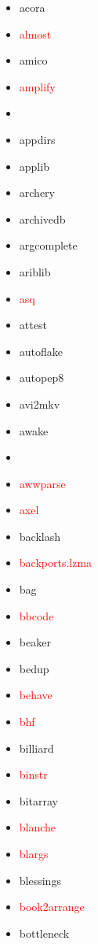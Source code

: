 \documentclass{l4proj}
\begin{document}
\begin{appendices}
\noindent\parbox[t]{0.32\textwidth}{\raggedright%
\begin{itemize}
\item acora
\item\textcolor{red}{almost}
\item amico
\item\textcolor{red}{amplify}
\item {}
\item appdirs
\item applib
\item archery
\item archivedb
\item argcomplete
\item ariblib
\item\textcolor{red}{asq}
\item attest
\item autoflake
\item autopep8
\item avi2mkv
\item awake
\end{itemize}
}%
\noindent\parbox[t]{0.32\textwidth}{\raggedright%
\begin{itemize}
\item\textcolor{red}{}
\item\textcolor{red}{awwparse}
\item\textcolor{red}{axel}
\item backlash
\item\textcolor{red}{backports.lzma}
\item bag
\item\textcolor{red}{bbcode}
\item beaker
\item bedup
\item\textcolor{red}{behave}
\item\textcolor{red}{bhf}
\item billiard
\item\textcolor{red}{binstr}
\item bitarray
\item\textcolor{red}{blanche}
\item\textcolor{red}{blargs}
\item blessings
\end{itemize}
}%
\noindent\parbox[t]{0.32\textwidth}{\raggedright%
\begin{itemize}
\item\textcolor{red}{book2arrange}
\item bottleneck

\end{itemize}}
\end{appendices}
\end{document}
